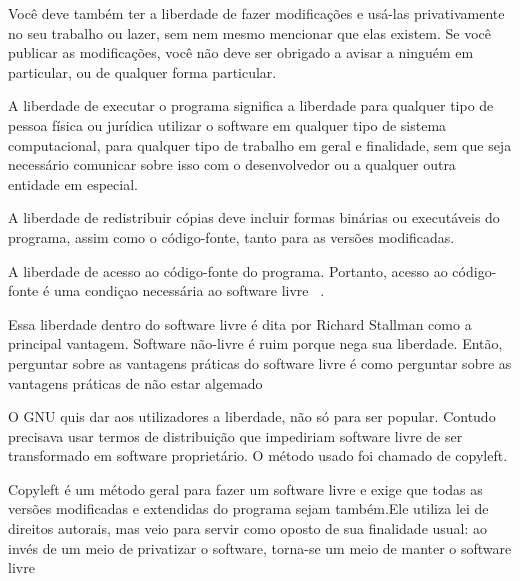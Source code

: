 Você deve também ter a liberdade de fazer modificações e usá-las privativamente no seu trabalho ou lazer, sem nem mesmo mencionar que elas existem. Se você publicar as modificações, você não deve ser obrigado a avisar a ninguém em particular, ou de qualquer forma particular.

A liberdade de executar o programa significa a liberdade para qualquer tipo de pessoa física ou jurídica utilizar o software em qualquer tipo de sistema computacional, para qualquer tipo de trabalho em geral e finalidade, sem que seja necessário comunicar sobre isso com o desenvolvedor ou a qualquer outra entidade em especial.

A liberdade de redistribuir cópias deve incluir formas binárias ou executáveis do programa, assim como o código-fonte, tanto para as versões modificadas.

A liberdade de acesso ao código-fonte do programa. Portanto, acesso ao código-fonte é uma condiçao necessária ao software livre ~\cite{}.%

%
Essa liberdade dentro do software livre é dita por Richard Stallman como a principal vantagem. Software não-livre é ruim porque nega sua liberdade. Então, perguntar sobre as vantagens práticas do software livre é como perguntar sobre as vantagens práticas de não estar algemado ~\cite{}%

%
O GNU quis dar aos utilizadores a liberdade, não só para ser popular. Contudo precisava usar termos de distribuição que impediriam software livre de ser transformado em software proprietário. O método usado foi chamado de copyleft.

%
Copyleft é um método geral para fazer um software livre e exige que todas as versões modificadas e extendidas do programa sejam também.Ele utiliza lei de direitos autorais, mas veio para servir como oposto de sua finalidade usual: ao invés de um meio de privatizar o software, torna-se um meio de manter o software livre~\cite{}%

